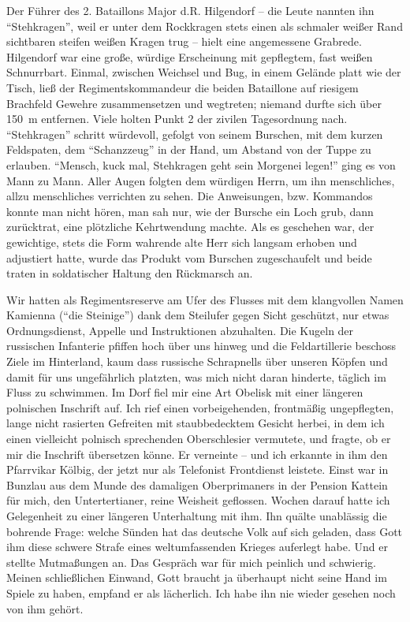 Der Führer des 2. Bataillons Major d.R. Hilgendorf -- die Leute nannten ihn \enquote{Stehkragen}, weil er unter dem Rockkragen stets einen als schmaler weißer Rand sichtbaren steifen weißen Kragen trug -- hielt eine angemessene Grabrede. Hilgendorf war eine große, würdige Erscheinung mit gepflegtem, fast weißen Schnurrbart. Einmal, zwischen Weichsel und Bug, in einem Gelände platt wie der Tisch, ließ der Regimentskommandeur die beiden Bataillone auf riesigem Brachfeld Gewehre zusammensetzen und wegtreten; niemand durfte sich über 150~m entfernen. Viele holten Punkt 2 der zivilen Tagesordnung nach. \enquote{Stehkragen} schritt würdevoll, gefolgt von seinem Burschen, mit dem kurzen Feldspaten, dem \enquote{Schanzzeug} in der Hand, um Abstand von der Tuppe zu erlauben. \enquote{Mensch, kuck mal, Stehkragen geht sein Morgenei legen!} ging es von Mann zu Mann. Aller Augen folgten dem würdigen Herrn, um ihn menschliches, allzu menschliches verrichten zu sehen. Die Anweisungen, bzw. Kommandos konnte man nicht hören, man sah nur, wie der Bursche ein Loch grub, dann zurücktrat, eine plötzliche Kehrtwendung machte. Als es geschehen war, der gewichtige, stets die Form wahrende alte Herr sich langsam erhoben und adjustiert hatte, wurde das Produkt vom Burschen zugeschaufelt und beide traten in soldatischer Haltung den Rückmarsch an.



Wir hatten als Regimentsreserve am Ufer des Flusses mit dem klangvollen Namen Kamienna (\enquote{die Steinige}) dank dem Steilufer gegen Sicht geschützt, nur etwas Ordnungsdienst, Appelle und Instruktionen abzuhalten. Die Kugeln der russischen Infanterie pfiffen hoch über uns hinweg und die Feldartillerie beschoss Ziele im Hinterland, kaum dass russische Schrapnells über unseren Köpfen und damit für uns ungefährlich platzten, was mich nicht daran hinderte, täglich im Fluss zu schwimmen. Im Dorf fiel mir eine Art Obelisk mit einer längeren polnischen Inschrift auf. Ich rief einen vorbeigehenden, frontmäßig ungepflegten, lange nicht rasierten Gefreiten mit staubbedecktem Gesicht herbei, in dem ich einen vielleicht polnisch sprechenden Oberschlesier vermutete, und fragte, ob er mir die Inschrift übersetzen könne. Er verneinte -- und ich erkannte in ihm den Pfarrvikar Kölbig, der jetzt nur als Telefonist Frontdienst leistete. Einst war in Bunzlau aus dem Munde des damaligen Oberprimaners in der Pension Kattein für mich, den Untertertianer, reine Weisheit geflossen. Wochen darauf hatte ich Gelegenheit zu einer längeren Unterhaltung mit ihm. Ihn quälte unablässig die bohrende Frage: welche Sünden hat das deutsche Volk auf sich geladen, dass Gott ihm diese schwere Strafe eines weltumfassenden Krieges auferlegt habe. Und er stellte Mutmaßungen an. Das Gespräch war für mich peinlich und schwierig. Meinen schließlichen Einwand, Gott braucht ja überhaupt nicht seine Hand im Spiele zu haben, empfand er als lächerlich. Ich habe ihn nie wieder gesehen noch von ihm gehört. 

